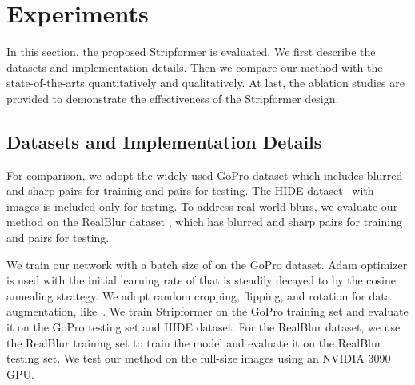 \section{Experiments}
In this section, the proposed Stripformer is evaluated. 
We first describe the datasets and implementation details. Then we compare our method with the state-of-the-arts quantitatively and qualitatively. 
At last, the ablation studies are provided to demonstrate the effectiveness of the Stripformer design. 
\subsection{Datasets and Implementation Details}
For comparison, we adopt the widely used GoPro dataset \cite{Nah_2017_CVPR} which includes  blurred and sharp pairs for training and  pairs for testing. 
The HIDE dataset~\cite{HAdeblur} with  images is included only for testing. 
To address real-world blurs, we evaluate our method on the RealBlur dataset \cite{rim_2020_ECCV}, which has  blurred and sharp pairs for training and  pairs for testing.


We train our network with a batch size of  on the GoPro dataset. 
Adam optimizer is used with the initial learning rate of  that is steadily decayed to  by the cosine annealing strategy. 
We adopt random cropping, flipping, and rotation for data augmentation, like~\cite{MT_2020_ECCV,Yuan_2020_CVPR}. We train Stripformer on the GoPro training set and evaluate it on the GoPro testing set and HIDE dataset. For the RealBlur dataset, we use the RealBlur training set to train the model and evaluate it on the RealBlur testing set. We test our method on the full-size images using an NVIDIA 3090 GPU. 

